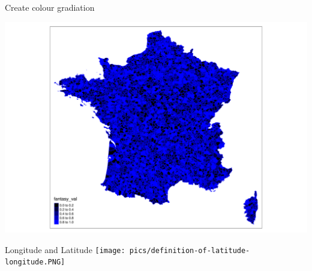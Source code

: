 \documentclass[
  ignorenonframetext,
]{beamer}
\newenvironment{Shaded}{\begin{snugshade}}{\end{snugshade}}
\newcommand{\DataTypeTok}[1]{\textcolor[rgb]{0.13,0.29,0.53}{#1}}
\newcommand{\DecValTok}[1]{\textcolor[rgb]{0.00,0.00,0.81}{#1}}
\newcommand{\KeywordTok}[1]{\textcolor[rgb]{0.13,0.29,0.53}{\textbf{#1}}}
\newcommand{\NormalTok}[1]{#1}
\newcommand{\OperatorTok}[1]{\textcolor[rgb]{0.81,0.36,0.00}{\textbf{#1}}}
\newcommand{\StringTok}[1]{\textcolor[rgb]{0.31,0.60,0.02}{#1}}
\begin{document}
\begin{frame}[fragile]{Create colour gradiation}
\protect\hypertarget{create-colour-gradiation}{}
\begin{Shaded}
\end{Shaded}

\includegraphics{quick_high_quality_maps_files/figure-beamer/unnamed-chunk-21-1.pdf}
\end{frame}

\begin{frame}{Longitude and Latitude}
\protect\hypertarget{longitude-and-latitude}{}
\texttt{[image: pics/definition-of-latitude-longitude.PNG]}
\end{frame}
\end{document}
